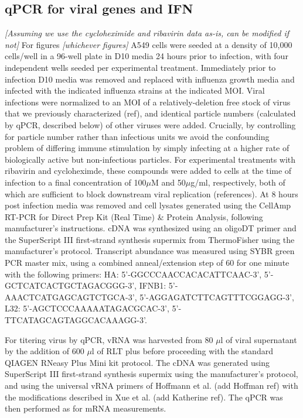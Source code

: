 \documentclass[9pt,lineno]{elife}
\newcommand{\abrcomment}[1]{\emph{\color{blue} [#1]}}
\begin{document}
\subsection{qPCR for viral genes and IFN}
\abrcomment{Assuming we use the cycloheximide and ribavirin data as-is, can be modified if not}
For figures \abrcomment{whichever figures} A549 cells were seeded at a density of 10,000 cells/well in a 96-well plate in D10 media 24 hours prior to infection, with four independent wells seeded per experimental treatment. 
Immediately prior to infection D10 media was removed and replaced with influenza growth media and infected with the indicated influenza strains at the indicated MOI.
Viral infections were normalized to an MOI of a relatively-deletion free stock of virus that we previously characterized (ref), and identical particle numbers (calculated by qPCR, described below) of other viruses were added.
Crucially, by controlling for particle number rather than infectious units we avoid the confounding problem of differing immune stimulation by simply infecting at a higher rate of biologically active but non-infectious particles.
For experimental treatments with ribavirin and cycloheximde, these compounds were added to cells at the time of infection to a final concentration of 100$\mu$M and 50$\mu$g/ml, respectively, both of which are sufficient to block downstream viral replication (references).
At 8 hours post infection media was removed and cell lysates generated using the CellAmp RT-PCR for Direct Prep Kit (Real Time) \& Protein Analysis, following manufacturer's instructions. 
cDNA was synthesized using an oligoDT primer and the SuperScript III first-strand synthesis supermix from ThermoFisher using the manufacturer’s protocol. 
Transcript abundance was measured using SYBR green PCR master mix, using a combined anneal/extension step of 60 for one minute with the following primers: HA: 5’-GGCCCAACCACACATTCAAC-3’, 5’-GCTCATCACTGCTAGACGGG-3’, IFNB1: 5’-AAACTCATGAGCAGTCTGCA-3’, 5’-AGGAGATCTTCAGTTTCGGAGG-3’, L32: 5’-AGCTCCCAAAAATAGACGCAC-3’, 5’-TTCATAGCAGTAGGCACAAAGG-3’. 

For titering virus by qPCR, vRNA was harvested from 80 $\mu$l of viral supernatant by the addition of 600 $\mu$l of RLT plus before proceeding with the standard QIAGEN RNeasy Plus Mini kit protocol. The cDNA was generated using SuperScript III first-strand synthesis supermix using the manufacturer’s protocol, and using the universal vRNA primers of Hoffmann et al. (add Hoffman ref) with the modifications described in Xue et al. (add Katherine ref). The qPCR was then performed as for mRNA measurements. 
\end{document}
